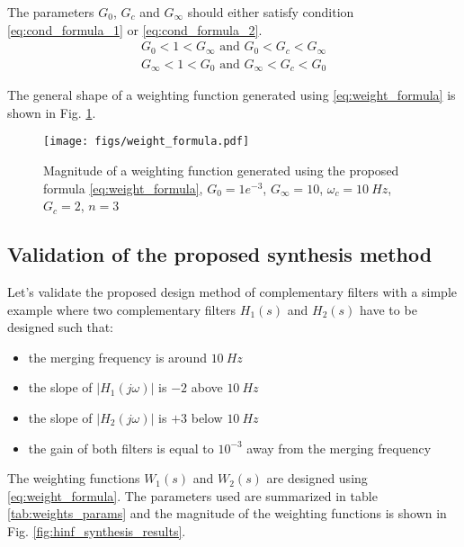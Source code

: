 \documentclass[conference]{IEEEtran}
\begin{document}
The parameters \(G_0\), \(G_c\) and \(G_\infty\) should either satisfy condition \eqref{eq:cond_formula_1} or \eqref{eq:cond_formula_2}.
\begin{subequations}
\label{eq:condition_params_formula}
  \begin{align}
    G_0 < 1 < G_\infty \text{ and } G_0 < G_c < G_\infty \label{eq:cond_formula_1}\\
    G_\infty < 1 < G_0 \text{ and } G_\infty < G_c < G_0 \label{eq:cond_formula_2}
  \end{align}
\end{subequations}

The general shape of a weighting function generated using \eqref{eq:weight_formula} is shown in Fig. \ref{fig:weight_formula}.

\begin{figure}[htbp]
\centering
\texttt{[image: figs/weight\_formula.pdf]}
\caption{\label{fig:weight_formula}
Magnitude of a weighting function generated using the proposed formula \eqref{eq:weight_formula}, \(G_0 = 1e^{-3}\), \(G_\infty = 10\), \(\omega_c = \SI{10}{Hz}\), \(G_c = 2\), \(n = 3\)}
\end{figure}

\subsection{Validation of the proposed synthesis method}
\label{sec:org0bf5120}
\label{sec:hinf_example}
Let's validate the proposed design method of complementary filters with a simple example where two complementary filters \(H_1(s)\) and \(H_2(s)\) have to be designed such that:
\begin{itemize}
\item the merging frequency is around \(\SI{10}{Hz}\)
\item the slope of \(|H_1(j\omega)|\) is \(-2\) above \(\SI{10}{Hz}\)
\item the slope of \(|H_2(j\omega)|\) is \(+3\) below \(\SI{10}{Hz}\)
\item the gain of both filters is equal to \(10^{-3}\) away from the merging frequency
\end{itemize}

The weighting functions \(W_1(s)\) and \(W_2(s)\) are designed using \eqref{eq:weight_formula}.
The parameters used are summarized in table \ref{tab:weights_params} and the magnitude of the weighting functions is shown in Fig. \ref{fig:hinf_synthesis_results}.
\end{document}
